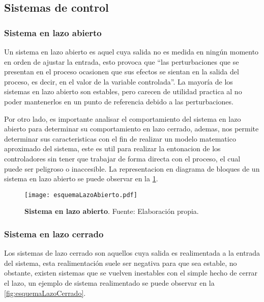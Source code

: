     \subsection{Sistemas de control}
		
		\subsubsection{Sistema en lazo abierto}
		
            Un sistema en lazo abierto es aquel cuya salida no es medida en ningún momento en orden de ajustar la entrada, esto provoca que \enquote{las perturbaciones que se presentan en el proceso ocasionen que sus efectos se sientan en la salida del proceso, es decir, en el valor de la variable controlada}\Parencite[p.$\,$350]{maloney2006electronica}. La mayoría de los sistemas en lazo abierto son estables, pero carecen de utilidad practica al no poder mantenerlos en un punto de referencia debido a las perturbaciones.
            
            Por otro lado, es importante analisar el comportamiento del sistema en lazo abierto para determinar su comportamiento en lazo cerrado, ademas, nos permite determinar sus caracteristicas con el fin de realizar un modelo matematico aproximado del sistema, este es util para realizar la entonacion de los controladores sin tener que trabajar de forma directa con el proceso, el cual puede ser peligroso o inaccesible. La representacion en diagrama de bloques de un sistema en lazo abierto se puede observar en la \cref{fig:esquemaLazoAbierto}.
            
            \begin{figure}[htb]
				\centering
				\texttt{[image: esquemaLazoAbierto.pdf]}
				\caption[Ejemplo de un sistema en lazo abierto]{\textbf{Sistema en lazo abierto}. Fuente: Elaboración propia.} 
				\label{fig:esquemaLazoAbierto}
            \end{figure}
        
        \subsubsection{Sistema en lazo cerrado}
		
			Los sistemas de lazo cerrado son aquellos cuya salida es realimentada a la entrada del sistema, esta realimentación suele ser negativa para que sea estable, no obstante, existen sistemas que se vuelven inestables con el simple hecho de cerrar el lazo, un ejemplo de sistema realimentado se puede observar en la \cref{fig:esquemaLazoCerrado}.
			
